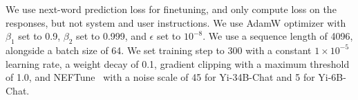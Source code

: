 We use next-word prediction loss for finetuning, and only compute loss on the responses, but not system and user instructions. 
We use AdamW optimizer
with $\beta_1$ set to 0.9, $\beta_2$ set to 0.999, and $\epsilon$ set to $10^{-8}$. 
We use a sequence length of 4096, alongside a batch size of 64.
We set training step to 300 with a constant $1\times 10^{-5}$ learning rate, a weight decay of 0.1, gradient clipping with a maximum threshold of 1.0, and NEFTune~\cite{jain2023neftune} with a noise scale of 45 for Yi-34B-Chat and 5 for Yi-6B-Chat.
